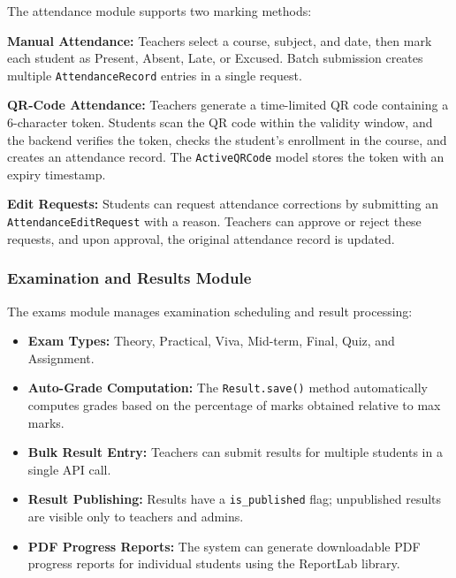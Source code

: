The attendance module supports two marking methods:

\textbf{Manual Attendance:} Teachers select a course, subject, and date, then mark each student as Present, Absent, Late, or Excused. Batch submission creates multiple \texttt{AttendanceRecord} entries in a single request.

\textbf{QR-Code Attendance:} Teachers generate a time-limited QR code containing a 6-character token. Students scan the QR code within the validity window, and the backend verifies the token, checks the student's enrollment in the course, and creates an attendance record. The \texttt{ActiveQRCode} model stores the token with an expiry timestamp.

\textbf{Edit Requests:} Students can request attendance corrections by submitting an \texttt{AttendanceEditRequest} with a reason. Teachers can approve or reject these requests, and upon approval, the original attendance record is updated.

\subsubsection{Examination and Results Module}

The exams module manages examination scheduling and result processing:

\begin{itemize}[leftmargin=2em]
    \item \textbf{Exam Types:} Theory, Practical, Viva, Mid-term, Final, Quiz, and Assignment.
    \item \textbf{Auto-Grade Computation:} The \texttt{Result.save()} method automatically computes grades based on the percentage of marks obtained relative to max marks.
    \item \textbf{Bulk Result Entry:} Teachers can submit results for multiple students in a single API call.
    \item \textbf{Result Publishing:} Results have a \texttt{is\_published} flag; unpublished results are visible only to teachers and admins.
    \item \textbf{PDF Progress Reports:} The system can generate downloadable PDF progress reports for individual students using the ReportLab library.
\end{itemize}

